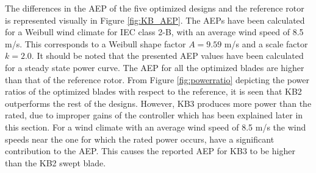 \begin{table}[pht]
\centering
\caption{Summary of overall properties of the five optimized blades.}
\label{tab:overall_summary}
\end{table}
The differences in the AEP of the five optimized designs and the reference rotor is represented visually in Figure \ref{fig:KB_AEP}. The AEPs have been calculated for a Weibull wind climate for IEC class 2-B, with an average wind speed of 8.5 m/s. This corresponds to a Weibull shape factor $A= 9.59$ m/s and a scale factor $k= 2.0$. It should be noted that the presented AEP values have been calculated for a steady state power curve. The AEP for all the optimized blades are higher than that of the reference rotor. From Figure \ref{fig:powerratio} depicting the power ratios of the optimized blades with respect to the reference, it is seen that KB2 outperforms the rest of the designs. However, KB3 produces more power than the rated, due to improper gains of the controller which has been explained later in this section. For a wind climate with an average wind speed of 8.5 m/s the wind speeds near the one for which the rated power occurs, have a significant contribution to the AEP. This causes the reported AEP for KB3 to be higher than the KB2 swept blade.


